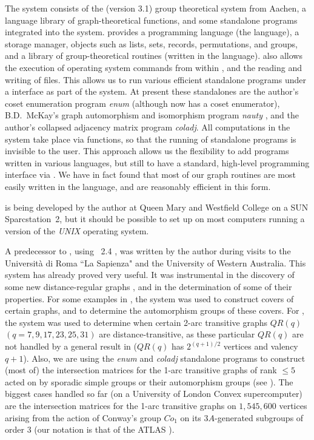 The {\GRAPE} system consists of the 
{\GAP} (version 3.1) group theoretical system \cite{11} 
from Aachen, a {\GAP} language library of 
graph-theoretical functions, and some standalone programs integrated 
into the system.
{\GAP} provides a programming language 
(the {\GAP} language), a storage manager, objects such as
lists, sets, records, permutations, and groups, and a library
of group-theoretical routines (written in the {\GAP}
language). {\GAP} also allows the execution of operating system
commands from within {\GAP}, 
and the reading and writing of files. This allows us
to run various efficient standalone programs under a {\GAP}
interface as part of the {\GRAPE} system. 
At present these standalones are the author's coset
enumeration program {\it enum} (although {\GAP} now 
has a coset enumerator), B.D.~McKay's graph 
automorphism and isomorphism program {\it nauty} \cite{8},
and the author's collapsed adjacency matrix program {\it coladj}. 
All computations in the {\GRAPE} system take place via 
{\GAP} functions, so that the running of  
standalone programs is invisible to the user.
This approach allows us the flexibility 
to add programs written in various languages, but still 
to have a standard, high-level programming interface via {\GAP}.
We have in fact found that most of our graph routines are
most easily written in the {\GAP} language, and are 
reasonably efficient in this form. 

{\GRAPE} is being developed by the author at
Queen Mary and Westfield College on a SUN Sparcstation~2, 
but it should be possible to set up {\GRAPE} on most
computers running a version of the {\it UNIX} operating system.    

A predecessor to {\GRAPE}, using
{\GAP}~2.4 \cite{9}, was written by the author during visits
to the Universit\`{a} di Roma ``La Sapienza" and 
the University of Western Australia.
This system has already proved very useful. 
It was instrumental in the discovery of some new distance-regular graphs
\cite{12}, and in the determination of some of their properties. 
For some examples in \cite{5}, the system was
used to construct covers of certain graphs, and to determine the 
automorphism groups of these covers. 
For \cite{6}, the system was used to determine when certain 2-arc 
transitive graphs $QR(q)$ $(q=7,9,17,23,25,31)$
are distance-transitive, as these particular $QR(q)$ 
are not handled by a general result in \cite{6}
($QR(q)$ has $2^{(q+1)/2}$ vertices and valency $q+1$). 
Also, we are using the {\it enum} and {\it coladj} standalone
programs to construct
(most of) the intersection matrices for the 1-arc transitive 
graphs of rank $\le5$
acted on by sporadic simple groups or their automorphism groups
(see \cite{10}). The biggest cases handled so far (on a University of 
London Convex supercomputer) are the intersection matrices for the
1-arc transitive graphs on $1,545,600$ vertices arising from the action 
of Conway's group $Co_1$ on its $3A$-generated subgroups of order 
3 (our notation is that of the ATLAS \cite{4}).


